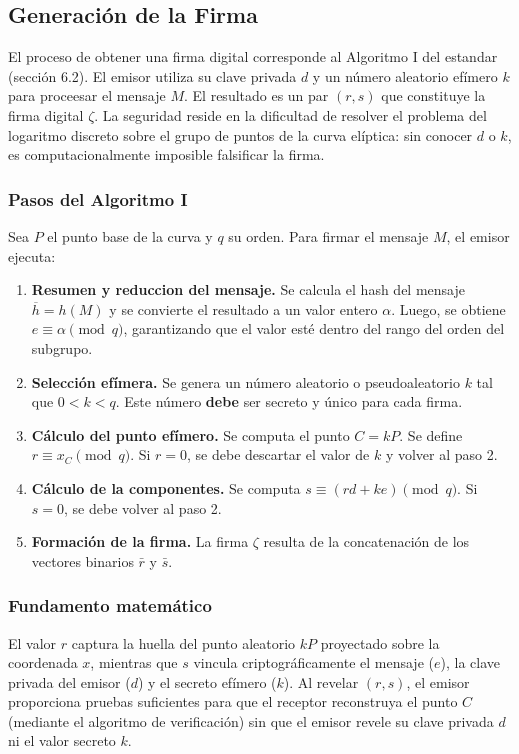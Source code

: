 \subsection{Generación de la Firma}
El proceso de obtener una firma digital corresponde al Algoritmo I del estandar
(sección 6.2). El emisor utiliza su clave privada $d$ y un número aleatorio efímero $k$ para proceesar el mensaje $M$. El resultado es un par $(r, s)$ que constituye la firma digital $\zeta$. La seguridad reside en la dificultad de resolver el problema del logaritmo discreto sobre el grupo de puntos de la curva elíptica: sin conocer $d$ o $k$, es computacionalmente imposible falsificar la firma.

\subsubsection{Pasos del Algoritmo I}
Sea $P$ el punto base de la curva y $q$ su orden. Para firmar el mensaje $M$, el emisor ejecuta:

\begin{enumerate}
    \item \textbf{Resumen y reduccion del mensaje.} Se calcula el hash del mensaje $\overline{h} = h(M)$ y se convierte el resultado a un valor entero $\alpha$. Luego, se obtiene $e \equiv \alpha \pmod q$, garantizando que el valor esté dentro del rango del orden del subgrupo.
    \item \textbf{Selección efímera.} Se genera un número aleatorio o pseudoaleatorio $k$ tal que $0 < k < q$. Este número \textbf{debe} ser secreto y único para cada firma.
    \item \textbf{Cálculo del punto efímero.} Se computa el punto $C = kP$. Se define $r \equiv x_C \pmod q$. Si $r = 0$, se debe descartar el valor de $k$ y volver al paso 2.
    \item \textbf{Cálculo de la componentes.} Se computa $s \equiv (rd + ke) \pmod q$. Si $s = 0$, se debe volver al paso 2.
    \item \textbf{Formación de la firma.} La firma $\zeta$ resulta de la concatenación de los vectores binarios $\bar{r}$ y $\bar{s}$.
\end{enumerate}

\subsubsection{Fundamento matemático}
El valor $r$ captura la huella del punto aleatorio $kP$ proyectado sobre la coordenada $x$, mientras que $s$ vincula criptográficamente el mensaje ($e$), la clave privada del emisor ($d$) y el secreto efímero ($k$). Al revelar $(r, s)$, el emisor proporciona pruebas suficientes para que el receptor reconstruya el punto $C$ (mediante el algoritmo de verificación) sin que el emisor revele su clave privada $d$ ni el valor secreto $k$.

